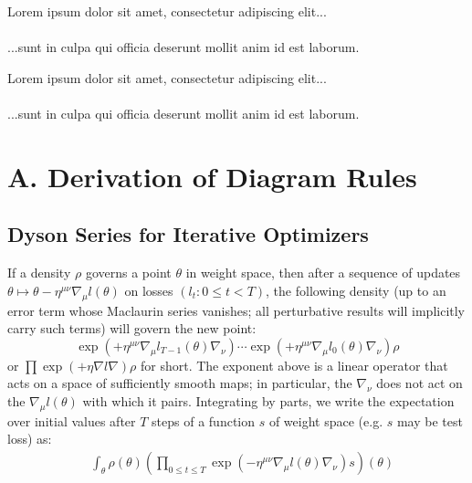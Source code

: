 \documentclass{article}
\newcommand{\lorem}[1]{
    Lorem ipsum dolor sit amet, consectetur adipiscing elit...\\
    \nopagebreak\vspace{#1cm} \ \\
    ...sunt in culpa qui officia deserunt mollit anim id est laborum.
}
\begin{document}
    
    

    \lorem{3}
    \lorem{3}


\section*{A. Derivation of Diagram Rules}

\subsection{Dyson Series for Iterative Optimizers}
    If a density $\rho$ governs a point $\theta$ in weight space, then after a
    sequence of updates $\theta \mapsto \theta - \eta^{\mu\nu} \nabla_\mu
    l(\theta)$ on losses $(l_t: 0\leq t < T)$, the following density (up to an
    error term whose Maclaurin series vanishes; all perturbative results will
    implicitly carry such terms) will govern the new point:
    \begin{equation}\label{eq:descexp}
        \exp\left(+\eta^{\mu\nu} \nabla_\mu l_{T-1}(\theta) \nabla_\nu\right) \cdots \exp\left(+\eta^{\mu\nu} \nabla_\mu l_0(\theta) \nabla_\nu\right) \rho
    \end{equation}
    or
    $
        \prod \exp\left(+\eta \nabla l \nabla\right) \rho
    $
    for short.
    The exponent above is a linear operator that acts on a space of
    sufficiently smooth maps; in particular, the $\nabla_\nu$ does not act on
    the $\nabla_\mu l(\theta)$ with which it pairs.  Integrating by parts, we
    write the expectation over initial values after $T$ steps of a function $s$
    of weight space (e.g. $s$ may be test loss) as:
    \begin{align}\label{eq:contraexp}
        &\int_\theta \rho(\theta) \left(\prod_{0 \leq t \leq T} \exp\left(-\eta^{\mu\nu} \nabla_\mu l(\theta) \nabla_\nu\right) s\right)(\theta)
    \end{align}
\end{document}
